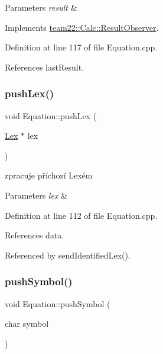 \begin{DoxyParams}{Parameters}
{\em result} & \\
\hline
\end{DoxyParams}


Implements \hyperlink{classteam22_1_1_calc_1_1_result_observer_aa04007df3aa8a499c3a511f549238285}{team22\+::\+Calc\+::\+Result\+Observer}.



Definition at line 117 of file Equation.\+cpp.



References last\+Result.

\mbox{\label{classteam22_1_1_calc_1_1_equation_af17ea6795813114d578e17109325d5e9}} 
\subsubsection{\texorpdfstring{push\+Lex()}{pushLex()}}
{\footnotesize\ttfamily void Equation\+::push\+Lex (\begin{DoxyParamCaption}\item[{\hyperlink{classteam22_1_1_calc_1_1_lex}{Lex} $\ast$}]{lex }\end{DoxyParamCaption})\hspace{0.3cm}{\ttfamily [private]}}

zpracuje příchozí Lexém 
\begin{DoxyParams}{Parameters}
{\em lex} & \\
\hline
\end{DoxyParams}


Definition at line 112 of file Equation.\+cpp.



References data.



Referenced by send\+Identified\+Lex().

\mbox{\label{classteam22_1_1_calc_1_1_equation_a324bf6372508c1b931c5ad8f39ccf8c4}} 
\subsubsection{\texorpdfstring{push\+Symbol()}{pushSymbol()}}
{\footnotesize\ttfamily void Equation\+::push\+Symbol (\begin{DoxyParamCaption}\item[{char}]{symbol }\end{DoxyParamCaption})}


